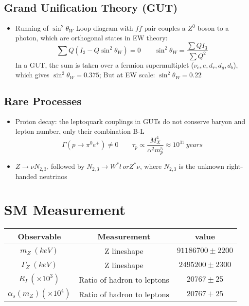 \subsection{Grand Unification Theory (GUT)}
\begin{itemize}
    \item Running of $\sin^2\theta_W$
	Loop diagram with $f\bar{f}$ pair couples a $Z^0$ boson to a photon, 
	which are orthogonal states in EW theory:
	$$ \sum Q(I_3 - Q\sin^2\theta_W) = 0 \qquad \sin^2\theta_W = \frac{\sum QI_3}{\sum Q^2} $$
	In a GUT, the sum is taken over a fermion supermultiplet ($\nu_e, e, d_r, d_g, d_b$),
	which gives $\sin^2\theta_W = 0.375$; But at EW scale: $\sin^2\theta_W = 0.22$
\end{itemize}
\subsection{Rare Processes}
\begin{itemize}
    \item Proton decay: the leptoquark couplings in GUTs do not conserve baryon
	and lepton number, only their combination B-L
	$$ \Gamma(p \rightarrow \pi^0e^+) \ne 0 \qquad \tau_p \propto \frac{M_X^4}{\alpha^2 m_p^5} \approx 10^{31} \ years $$
    \item $Z \rightarrow \nu N_{2,3}$, followed by $N_{2,3} \rightarrow W^* l \ or Z^*\nu$,
	where $N_{2,3}$ is the unknown right-handed neutrinos
\end{itemize}

\section{SM Measurement}
\begin{table}
    \begin{tabular}{c | c | c}
	\hline
	Observable  & Measurement   & value \\
	\hline
	$m_Z \ (keV)$	& Z lineshape	& $91186700 \pm 2200$	\\
	$\Gamma_Z \ (keV)$	& Z lineshape	& $2495200 \pm 2300$	\\
	$R_I \ (\times 10^3)$	& Ratio of hadron to leptons	& $20767 \pm 25$	\\
	$\alpha_s (m_Z) (\times 10^4)$	& Ratio of hadron to leptons	& $20767 \pm 25$	\\
	\hline
    \end{tabular}
\end{table}

